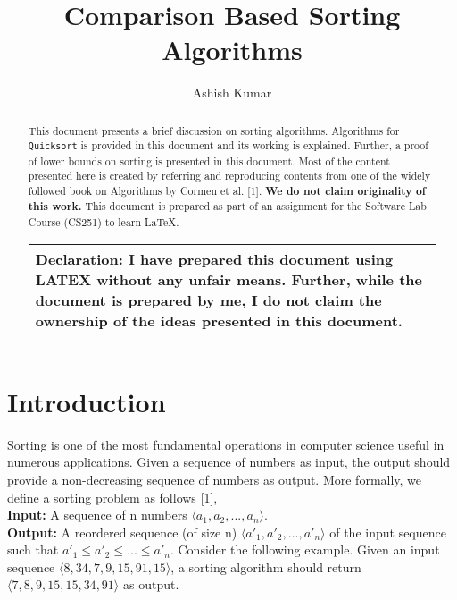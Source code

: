 \documentclass[a4paper, 10pt,twocolumn]{article}
\title{Comparison Based Sorting Algorithms}
\author{Ashish Kumar}
\date{}
\begin{document}
\maketitle
\begin{abstract}
This document presents a brief discussion on sorting algorithms. Algorithms for \texttt{Quicksort} is provided in this document and its working is explained. Further, a proof of lower bounds on sorting is
presented in this document. Most of the content presented here is created by referring and reproducing
contents from one of the widely followed book on Algorithms by Cormen et al. [1]. \textbf{We do not claim
originality of this work.} This document is prepared as part of an assignment for the Software Lab
Course (CS251) to learn \LaTeX.
\hfill\break
\begin{tabular}{|p{7.2 cm}|}
\hline
Declaration: I have prepared this document using LATEX without any unfair means. Further, while the document is prepared by me, I do not claim the ownership of the ideas presented in this document.\\
\hline
\end{tabular}
\end{abstract}


\section{Introduction}
Sorting is one of the most fundamental operations
in computer science useful in numerous applications.
Given a sequence of numbers as input, the
output should provide a non-decreasing sequence
of numbers as output. More formally, we define a
sorting problem as follows [1],\\
\textbf{Input: }A sequence of n numbers $ \langle a_1, a_2, ..., a_{n} \rangle$. \\
\textbf{Output: }A reordered sequence (of size n)  $ \langle a'_1, a'_2, ..., a'_{n} \rangle$ of the input sequence such that $ a'_1 \leq a'_2 \leq ... \leq a'_n $.\newline
\noindent Consider the following example. Given an input sequence $ \langle 8, 34, 7, 9, 15, 91, 15 \rangle $, a sorting algorithm should return $ \langle 7, 8, 9, 15, 15, 34, 91 \rangle $  as output.
\end{document}
